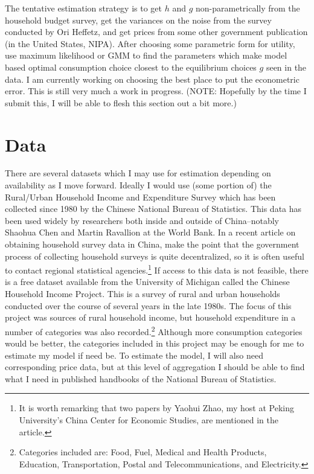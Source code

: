 \documentclass[a4paper,10pt]{article}
\begin{document}
The tentative estimation strategy is to get $h$ and $g$ non-parametrically from the household budget survey, get the variances on the noise from the survey conducted by Ori Heffetz, and get prices from some other government publication (in the United States, NIPA).  After choosing some parametric form for utility, use maximum likelihood or GMM to find the parameters which make model based optimal consumption choice closest to the equilibrium choices $g$ seen in the data.  I am currently working on choosing the best place to put the econometric error.  This is still very much a work in progress. (NOTE: Hopefully by the time I submit this, I will be able to flesh this section out a bit more.)     

\section{Data}
There are several datasets which I may use for estimation depending on availability as I move forward.  Ideally I would use (some portion of) the Rural/Urban Household Income and Expenditure Survey which has been collected since 1980 by the Chinese National Bureau of Statistics.  This data has been used widely by researchers both inside and outside of China--notably Shaohua Chen and Martin Ravallion at the World Bank.  In a recent article on obtaining household survey data in China, \citet{GustafssonShi2006} make the point that the government process of collecting household surveys is quite decentralized, so it is often useful to contact regional statistical agencies.\footnote{It is worth remarking that two papers by Yaohui Zhao, my host at Peking University's China Center for Economic Studies, are mentioned in the article.}  If access to this data is not feasible, there is a free dataset available from the University of Michigan called the Chinese Household Income Project.  This is a survey of rural and urban households conducted over the course of several years in the late 1980s.  The focus of this project was sources of rural household income, but household expenditure in a number of categories was also recorded.\footnote{Categories included are: Food, Fuel, Medical and Health Products, Education, Transportation, Postal and Telecommunications, and Electricity.}  Although more consumption categories would be better, the categories included in this project may be enough for me to estimate my model if need be.  To estimate the model, I will also need corresponding price data, but at this level of aggregation I should be able to find what I need in published handbooks of the National Bureau of Statistics.    
\end{document}
